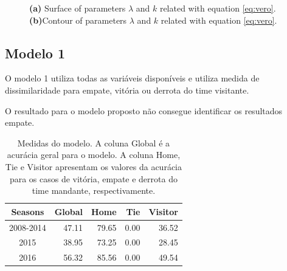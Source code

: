 \documentclass[doc,apacite,oneside,a4paper,12pt]{apa6}
\begin{document}
\begin{figure}%
    \centering
    \qquad
    \caption[\scriptsize{Tunning parameters.}]{\scriptsize{ \textbf{(a)} Surface of parameters $\lambda$ and $k$ related with equation \ref{eq:vero}.\textbf{(b)}Contour of parameters $\lambda$ and $k$ related with equation \ref{eq:vero}.}}
    \label{fig:tunning}%
\end{figure}


\subsection{Modelo 1}
\label{sec:mod1}

O modelo 1 utiliza todas as variáveis disponíveis e utiliza medida de dissimilaridade para empate, vitória ou derrota do time visitante.



O resultado para o modelo proposto não consegue identificar os resultados empate.

\begin{table}[ht]
\centering
\begin{tabular}{crrrr}
  \hline
Seasons & Global & Home & Tie & Visitor \\ 
  \hline
2008-2014 & 47.11 & 79.65 & 0.00 & 36.52 \\ 
  2015 & 38.95 & 73.25 & 0.00 & 28.45 \\ 
  2016 & 56.32 & 85.56 & 0.00 & 49.54 \\ 
   \hline
\end{tabular}
    \caption[\scriptsize{Medidas do modelo.}]{\scriptsize{Medidas do modelo. A coluna Global é a acurácia geral para o modelo. A coluna Home, Tie e Visitor apresentam os valores da acurácia para os casos de vitória, empate e derrota do time mandante, respectivamente.}}
    \label{tab:medidasmod}
\end{table}
\end{document}
